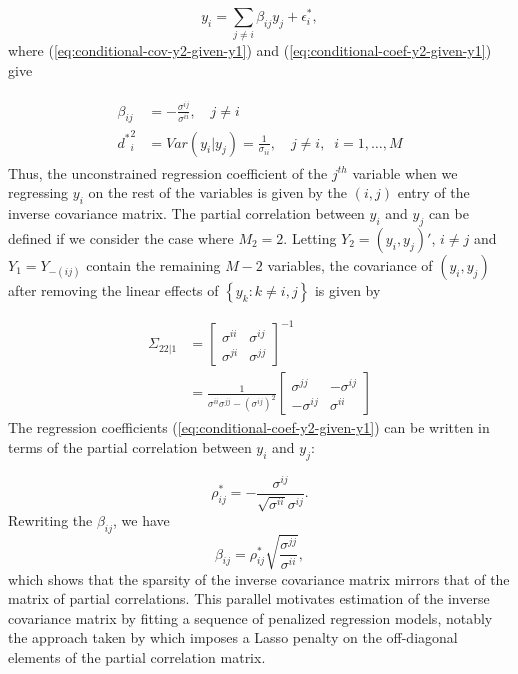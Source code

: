 \[
y_i = \sum_{j \ne i} \beta_{ij} y_j + \epsilon^*_i,
\] 
\noindent
where (\ref{eq:conditional-cov-y2-given-y1}) and (\ref{eq:conditional-coef-y2-given-y1}) give 

\begin{align}
 \begin{split} \label{eq:conditional-coef-y2-given-y1}
\beta_{ij} &= -\frac{\sigma^{ij}}{\sigma^{ii}}, \quad j \ne i \\
{d^*}_i^2 &= Var\left(y_i \vert y_j\right) =  \frac{1}{\sigma_{ii}},\quad j \ne i, \;\; i = 1,\dots, M
 \end{split}
\end{align}
\noindent
Thus, the unconstrained regression coefficient of the $j^{th}$ variable when we regressing $y_i$ on the rest of the variables is given by the $\left(i,j\right)$ entry of the inverse covariance matrix. The partial correlation between $y_i$ and $y_j$ can be defined if we consider the case where $M_2 = 2$. Letting $Y_2 = \left(y_i, y_j\right)'$, $i \ne j$ and $Y_1 = Y_{-\left(ij\right)}$ contain the remaining $M - 2$ variables, the covariance of $\left(y_i, y_j\right)$ after removing the linear effects of $\left\{ y_k : k \ne i,j\right\}$ is given by 

\begin{align*}
\Sigma_{22 \vert 1} &= \begin{bmatrix} \sigma^{ii} & \sigma^{ij} \\ \sigma^{ji} & \sigma^{jj} \end{bmatrix}^{-1} \\
&= \frac{1}{\sigma^{ii}\sigma^{jj} - \left(\sigma^{ij}\right)^2}\begin{bmatrix} \sigma^{jj} & -\sigma^{ij} \\ -\sigma^{ij} & \sigma^{ii}\end{bmatrix}
\end{align*}
\noindent
The regression coefficients (\ref{eq:conditional-coef-y2-given-y1}) can be written in terms of the partial correlation between $y_i$ and $y_j$:

\begin{equation} \label{eq:partial-correlation-coefficient}
\rho^*_{ij} = -\frac{\sigma^{ij}}{\sqrt{\sigma^{ii}}\sigma^{ij}}.
\end{equation}
\noindent
Rewriting the $\beta_{ij}$, we have
\begin{equation} \label{eq:partial-correlation-coefficient}
\beta_{ij} = \rho^*_{ij} \sqrt{\frac{\sigma^{jj}}{\sigma^{ii}}},
\end{equation}
\noindent
which shows that the sparsity of the inverse covariance matrix mirrors that of the matrix of partial correlations. This parallel motivates estimation of the inverse covariance matrix by fitting a sequence of penalized regression models, notably the  approach taken by \cite{peng2012partial} which imposes a Lasso penalty on the off-diagonal elements of the partial correlation matrix. 


